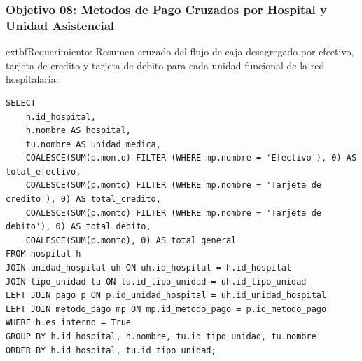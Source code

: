\documentclass[11pt,a4paper]{article}
\begin{document}
\subsubsection{Objetivo 08: Metodos de Pago Cruzados por Hospital y Unidad Asistencial}
	extbf{Requerimiento:} Resumen cruzado del flujo de caja desagregado por efectivo, tarjeta de credito y tarjeta de debito para cada unidad funcional de la red hospitalaria.
\begin{lstlisting}[style=sqlstyle]
SELECT 
    h.id_hospital,
    h.nombre AS hospital,
    tu.nombre AS unidad_medica,
    COALESCE(SUM(p.monto) FILTER (WHERE mp.nombre = 'Efectivo'), 0) AS total_efectivo,
    COALESCE(SUM(p.monto) FILTER (WHERE mp.nombre = 'Tarjeta de credito'), 0) AS total_credito,
    COALESCE(SUM(p.monto) FILTER (WHERE mp.nombre = 'Tarjeta de debito'), 0) AS total_debito,
    COALESCE(SUM(p.monto), 0) AS total_general
FROM hospital h
JOIN unidad_hospital uh ON uh.id_hospital = h.id_hospital
JOIN tipo_unidad tu ON tu.id_tipo_unidad = uh.id_tipo_unidad
LEFT JOIN pago p ON p.id_unidad_hospital = uh.id_unidad_hospital
LEFT JOIN metodo_pago mp ON mp.id_metodo_pago = p.id_metodo_pago
WHERE h.es_interno = True
GROUP BY h.id_hospital, h.nombre, tu.id_tipo_unidad, tu.nombre
ORDER BY h.id_hospital, tu.id_tipo_unidad;
\end{lstlisting}
\end{document}
